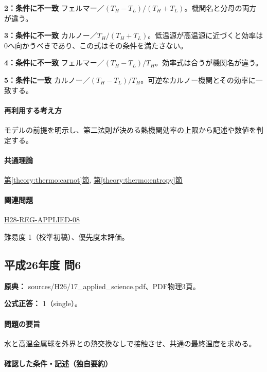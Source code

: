 \noindent\textbf{2：条件に不一致} フェルマー／\((T_H-T_L)/(T_H+T_L)\)。機関名と分母の両方が違う。\par

\noindent\textbf{3：条件に不一致} カルノー／\(T_H/(T_H+T_L)\)。低温源が高温源に近づくと効率は0へ向かうべきであり、この式はその条件を満たさない。\par

\noindent\textbf{4：条件に不一致} フェルマー／\((T_H-T_L)/T_H\)。効率式は合うが機関名が違う。\par

\noindent\textbf{5：条件に一致} カルノー／\((T_H-T_L)/T_H\)。可逆なカルノー機関とその効率に一致する。\par

\paragraph{再利用する考え方} モデルの前提を明示し、第二法則が決める熱機関効率の上限から記述や数値を判定する。

\paragraph{共通理論} \hyperref[theory:thermo:carnot]{第\ref*{theory:thermo:carnot}節}, \hyperref[theory:thermo:entropy]{第\ref*{theory:thermo:entropy}節}

\paragraph{関連問題} \hyperref[q:h28-reg-applied-08]{H28-REG-APPLIED-08}

\par 難易度 1（校準初稿）、優先度未評価。

\subsection{平成26年度 問6}
\label{q:h26-reg-applied-06}

\noindent\textbf{原典：} sources/H26/17\_applied\_science.pdf、PDF物理3頁。

\textbf{公式正答：} 1（single）。

\paragraph{問題の要旨} 水と高温金属球を外界との熱交換なしで接触させ、共通の最終温度を求める。

\paragraph{確認した条件・記述（独自要約）}\mbox{}\par

